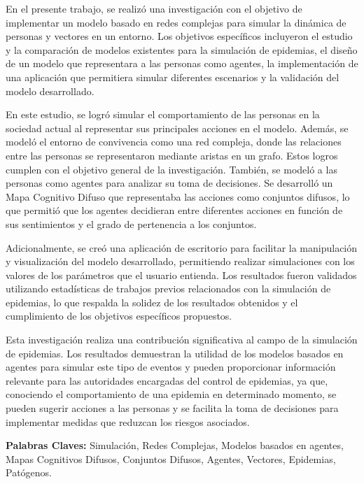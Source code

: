 \begin{resumen}
	En el presente trabajo, se realizó una investigación con el objetivo de implementar 
    un modelo basado en redes complejas para simular la dinámica de personas y vectores 
    en un entorno. Los objetivos específicos incluyeron el estudio y la comparación de 
    modelos existentes para la simulación de epidemias, el diseño de un modelo que 
    representara a las personas como agentes, la implementación de una aplicación que 
    permitiera simular diferentes escenarios y la validación del modelo desarrollado.

    En este estudio, se logró simular el comportamiento de las personas en la sociedad actual 
    al representar sus principales acciones en el modelo. Además, se modeló el entorno de 
    convivencia como una red compleja, donde las relaciones entre las personas se 
    representaron mediante aristas en un grafo. Estos logros cumplen con el objetivo general 
    de la investigación. También, se modeló a las personas como agentes para analizar su toma 
    de decisiones. Se desarrolló un Mapa Cognitivo Difuso que representaba las acciones como 
    conjuntos difusos, lo que permitió que los agentes decidieran entre diferentes acciones 
    en función de sus sentimientos y el grado de pertenencia a los conjuntos.

    Adicionalmente, se creó una aplicación de escritorio para facilitar la manipulación y 
    visualización del modelo desarrollado, permitiendo realizar simulaciones con los valores 
    de los parámetros que el usuario entienda. Los resultados fueron validados 
    utilizando estadísticas de trabajos previos relacionados con la simulación de epidemias, 
    lo que respalda la solidez de los resultados obtenidos y el cumplimiento de los objetivos 
    específicos propuestos.

    Esta investigación realiza una contribución significativa al campo de la simulación de 
    epidemias. Los resultados demuestran la utilidad de los modelos basados en 
    agentes para simular este tipo de eventos y pueden proporcionar información relevante para las 
    autoridades encargadas del control de epidemias, ya que, conociendo el comportamiento de una 
    epidemia en determinado momento, se pueden sugerir acciones a las personas y se facilita la 
    toma de decisiones para implementar medidas que reduzcan los riesgos asociados.

	\textbf{Palabras Claves:} Simulación, Redes Complejas, Modelos basados en agentes, Mapas Cognitivos Difusos,
	Conjuntos Difusos, Agentes, Vectores, Epidemias, Patógenos.
\end{resumen}

